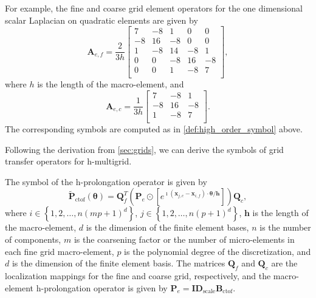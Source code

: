 \documentclass[review]{siamart190516}
\begin{document}
For example, the fine and coarse grid element operators for the one dimensional scalar Laplacian on quadratic elements are given by
\begin{equation}
\mathbf{A}_{e, f} =
\frac{2}{3h}
\begin{bmatrix}
 7  &  -8  &   1  &   0  &   0  \\
-8  &  16  &  -8  &   0  &   0  \\
 1  &  -8  &  14  &  -8  &   1  \\
 0  &   0  &  -8  &  16  &  -8  \\
 0  &   0  &   1  &  -8  &   7  \\
\end{bmatrix},
\end{equation}
where $h$ is the length of the macro-element, and
\begin{equation}
\mathbf{A}_{e, c} =
\frac{1}{3h}
\begin{bmatrix}
 7  &  -8  &   1  \\
-8  &  16  &  -8  \\
 1  &  -8  &   7  \\
\end{bmatrix}.
\end{equation}
The corresponding symbols are computed as in \cref{def:high_order_symbol} above.

Following the derivation from \cref{sec:grids}, we can derive the symbols of grid transfer operators for h-multigrid.

\begin{definition}\label{def:h_prolongation_symbol}
The symbol of the h-prolongation operator is given by
\begin{equation}
\tilde{\mathbf{P}}_{\text{ctof}} \left( \boldsymbol{\theta} \right) = \mathbf{Q}_f^T \left( \mathbf{P}_e \odot \left[ e^{\imath \left( \mathbf{x}_{j, c} - \mathbf{x}_{i, f} \right) \cdot \mathbf{\theta} / \mathbf{h}} \right] \right) \mathbf{Q}_c,
\end{equation}
where $i \in \left\lbrace 1, 2, \dots, n \left( m p + 1 \right)^d \right\rbrace$, $j \in \left\lbrace 1, 2, \dots, n \left( p + 1 \right)^d \right\rbrace$, $\mathbf{h}$ is the length of the macro-element, $d$ is the dimension of the finite element bases, $n$ is the number of components, $m$ is the coarsening factor or the number of micro-elements in each fine grid macro-element, $p$ is the polynomial degree of the discretization, and $d$ is the dimension of the finite element basis.
The matrices $\mathbf{Q}_f$ and $\mathbf{Q}_c$ are the localization mappings for the fine and coarse grid, respectively, and the macro-element h-prolongation operator is given by $\mathbf{P}_e = \mathbf{I} \mathbf{D}_{\text{scale}} \mathbf{B}_{\text{ctof}}$.
\end{definition}
\end{document}

